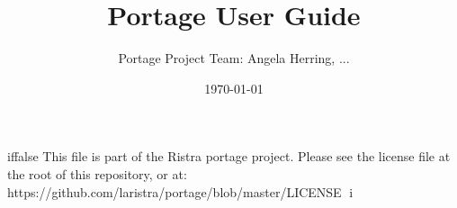 iffalse
This file is part of the Ristra portage project.
Please see the license file at the root of this repository, or at:
    https://github.com/laristra/portage/blob/master/LICENSE
i




\title{Portage User Guide}
\date{\today}
\author{Portage Project Team: Angela Herring, ...}


